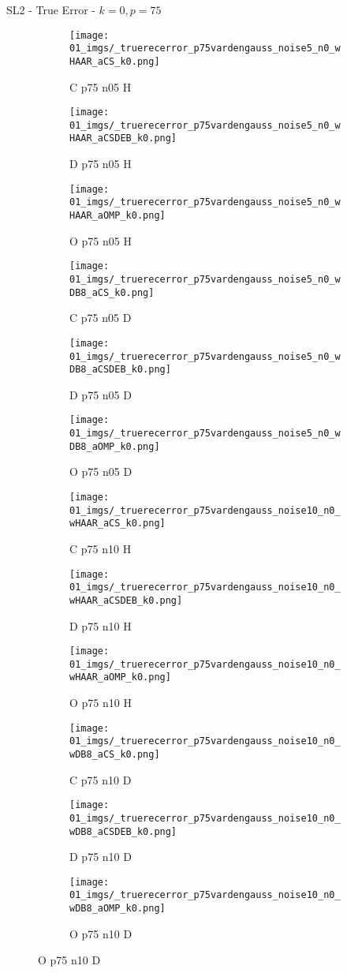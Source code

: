 \begin{frame}{SL2 - True Error - $k=0,p=75$}{}
\begin{figure}
\begin{subfigure}{0.13\textwidth}
\texttt{[image: 01\_imgs/\_truerecerror\_p75vardengauss\_noise5\_n0\_wHAAR\_aCS\_k0.png]}
\caption*{\tiny C p75 n05 H}
\end{subfigure}
\begin{subfigure}{0.13\textwidth}
\texttt{[image: 01\_imgs/\_truerecerror\_p75vardengauss\_noise5\_n0\_wHAAR\_aCSDEB\_k0.png]}
\caption*{\tiny D p75 n05 H}
\end{subfigure}
\begin{subfigure}{0.13\textwidth}
\texttt{[image: 01\_imgs/\_truerecerror\_p75vardengauss\_noise5\_n0\_wHAAR\_aOMP\_k0.png]}
\caption*{\tiny O p75 n05 H}
\end{subfigure}
\begin{subfigure}{0.13\textwidth}
\texttt{[image: 01\_imgs/\_truerecerror\_p75vardengauss\_noise5\_n0\_wDB8\_aCS\_k0.png]}
\caption*{\tiny C p75 n05 D}
\end{subfigure}
\begin{subfigure}{0.13\textwidth}
\texttt{[image: 01\_imgs/\_truerecerror\_p75vardengauss\_noise5\_n0\_wDB8\_aCSDEB\_k0.png]}
\caption*{\tiny D p75 n05 D}
\end{subfigure}
\begin{subfigure}{0.13\textwidth}
\texttt{[image: 01\_imgs/\_truerecerror\_p75vardengauss\_noise5\_n0\_wDB8\_aOMP\_k0.png]}
\caption*{\tiny O p75 n05 D}
\end{subfigure}

\vspace{5pt}

\begin{subfigure}{0.13\textwidth}
\texttt{[image: 01\_imgs/\_truerecerror\_p75vardengauss\_noise10\_n0\_wHAAR\_aCS\_k0.png]}
\caption*{\tiny C p75 n10 H}
\end{subfigure}
\begin{subfigure}{0.13\textwidth}
\texttt{[image: 01\_imgs/\_truerecerror\_p75vardengauss\_noise10\_n0\_wHAAR\_aCSDEB\_k0.png]}
\caption*{\tiny D p75 n10 H}
\end{subfigure}
\begin{subfigure}{0.13\textwidth}
\texttt{[image: 01\_imgs/\_truerecerror\_p75vardengauss\_noise10\_n0\_wHAAR\_aOMP\_k0.png]}
\caption*{\tiny O p75 n10 H}
\end{subfigure}
\begin{subfigure}{0.13\textwidth}
\texttt{[image: 01\_imgs/\_truerecerror\_p75vardengauss\_noise10\_n0\_wDB8\_aCS\_k0.png]}
\caption*{\tiny C p75 n10 D}
\end{subfigure}
\begin{subfigure}{0.13\textwidth}
\texttt{[image: 01\_imgs/\_truerecerror\_p75vardengauss\_noise10\_n0\_wDB8\_aCSDEB\_k0.png]}
\caption*{\tiny D p75 n10 D}
\end{subfigure}
\begin{subfigure}{0.13\textwidth}
\texttt{[image: 01\_imgs/\_truerecerror\_p75vardengauss\_noise10\_n0\_wDB8\_aOMP\_k0.png]}
\caption*{\tiny O p75 n10 D}
\end{subfigure}


\end{figure}
\end{frame}
